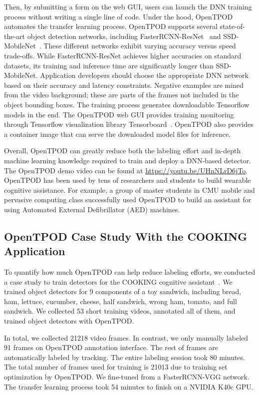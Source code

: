 Then, by submitting a form on the web GUI, users can launch the DNN training
process without writing a single line of code. Under the hood, OpenTPOD automates
the transfer learning process. OpenTPOD supports several state-of-the-art object
detection networks, including FasterRCNN-ResNet~\cite{Ren2015,He2016} and
SSD-MobileNet~\cite{Liu2016,Howard2017}. These different networks exhibit
varying accuracy versus speed trade-offs. While FasterRCNN-ResNet achieves higher
accuracies on standard datasets, its training and inference time are
significantly longer than SSD-MobileNet. Application developers should choose
the appropriate DNN network based on their accuracy and latency constraints.
Negative examples are mined from the video background; these are parts of the
frames not included in the object bounding boxes.  The training process
generates downloadable Tensorflow models in the end. The OpenTPOD web GUI provides
training monitoring through Tensorflow visualization library
Tensorboard~\cite{tensorflow2017}. OpenTPOD also provides a container image that can
serve the downloaded model files for inference.

Overall, OpenTPOD can greatly reduce both the labeling effort and in-depth
machine learning knowledge required to train and deploy a DNN-based detector.
The OpenTPOD demo video can be found at \url{https://youtu.be/UHnNLrD6jTo}.
OpenTPOD has been used by tens of researchers and students to build wearable
cognitive assistance. For example, a group of master students in CMU mobile and
pervasive computing class successfully used OpenTPOD to build an assistant for
using Automated External Defibrillator (AED) machines.

\subsection{OpenTPOD Case Study With the COOKING Application}

To quantify how much OpenTPOD can help reduce labeling efforts, we conducted a case
study to train detectors for the COOKING cognitive
assistant~\cite{chen2018application}. We trained object detectors for 9
components of a toy sandwich, including bread, ham, lettuce, cucumber, cheese,
half sandwich, wrong ham, tomato, and full sandwich. We collected 53 short
training videos, annotated all of them, and trained object detectors with OpenTPOD.

In total, we collected 21218 video frames. In contrast, we only manually labeled
91 frames on OpenTPOD annotation interface. The rest of frames are automatically
labeled by tracking. The entire labeling session took 80 minutes. The total
number of frames used for training is 21013 due to training set optimization by
OpenTPOD. We fine-tuned from a FasterRCNN-VGG network. The transfer learning process
took 54 minutes to finish on a NVIDIA K40c GPU.


